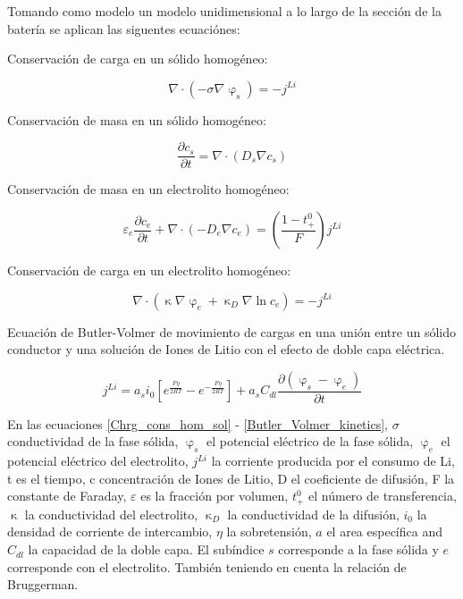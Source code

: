 \documentclass[10pt,a4paper]{article}
\begin{document}
Tomando como modelo un modelo unidimensional a lo largo de la sección de la
batería se aplican las siguentes ecuaciónes:

\vspace{5mm}

Conservación de carga en un sólido homogéneo:

\begin{equation}
    \nabla \cdot (-\sigma\nabla\upvarphi_s)=-j^{Li} 
    \label{Chrg_cons_hom_sol}
\end{equation}	

Conservación de masa en un sólido homogéneo:

\begin{equation}
    \frac{\partial c_s}{\partial t}=\nabla \cdot (D_s\nabla c_s) 
    \label{Mass_cons_hom_sol}
\end{equation}	

Conservación de masa en un electrolito homogéneo:

\begin{equation}
    \varepsilon_e\frac{\partial c_e}{\partial t} + \nabla \cdot (-D_e\nabla c_e) = (\frac{1-t_+^0}{F})j^{Li}
    \label{Mass_cons_hom_electrolyte}
\end{equation}	

Conservación de carga en un electrolito homogéneo:

\begin{equation}
    \nabla \cdot (\upkappa \nabla \upvarphi_e + \upkappa_D \nabla \ln c_e) = -j^{Li}
    \label{Chrg_cons_hom_electrolyte}
\end{equation}	

Ecuación de Butler-Volmer de movimiento de cargas en una unión entre un sólido
conductor y una solución de Iones de Litio con el efecto de doble capa
eléctrica.

\begin{equation}
    j^{Li} = a_si_0[{e^\frac{F\eta}{2RT}-e^{-\frac{F\eta}{2RT}}}]+ a_sC_{dl}\frac{\partial{(\upvarphi_s - \upvarphi_e)}}{\partial t}
    \label{Butler_Volmer_kinetics}
\end{equation}	

En las ecuaciones \ref{Chrg_cons_hom_sol} - \ref{Butler_Volmer_kinetics},
$\sigma$  conductividad de la fase sólida, $\upvarphi_s$ el potencial eléctrico
de la fase sólida, $\upvarphi_e$ el potencial eléctrico del electrolito,
$j^{Li}$ la corriente producida por el consumo de Li, t es el tiempo, c
concentración de Iones de Litio, D el coeficiente de difusión, F la constante de
Faraday, $\varepsilon$ es la fracción por volumen, $t_+^0$ el número de
transferencia, $\upkappa$ la conductividad del electrolito, $\upkappa_D$ la
conductividad de la difusión, $i_0$ la densidad de corriente de intercambio,
$\eta$ la sobretensión, $a$ el area específica and $C_{dl}$ la capacidad de la
doble capa. El subíndice $s$ corresponde a la fase sólida y $e$ corresponde con
el electrolito. También teniendo en cuenta la relación de Bruggerman.
\end{document}
